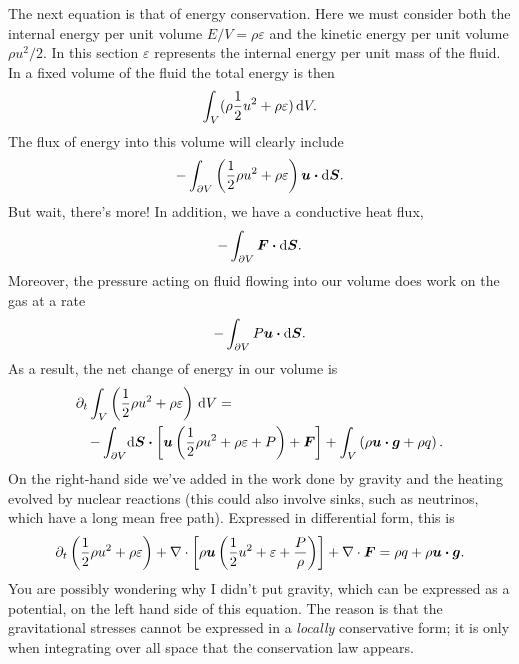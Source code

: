 The next equation is that of energy conservation. Here we must consider both the internal energy per unit volume $E/V = \rho \varepsilon$ and the kinetic energy per unit volume $\rho u^{2}/2$.  In this section $\varepsilon$ represents the internal energy per unit mass of the fluid. In a fixed volume of the fluid the total energy is then 
\[ \int_{V}(\rho \frac{1}{2}u^{2} + \rho \varepsilon)\,\mathrm{d} V. \]
The flux of energy into this volume will clearly include
\[ -\int_{\partial V}\left(\frac{1}{2}\rho u^{2} + \rho \varepsilon\right) \boldsymbol{u}\boldsymbol{\cdot}\mathrm{d}\boldsymbol{S}. \]
But wait, there's more!  In addition, we have a conductive heat flux, 
\[-\int_{\partial V}\boldsymbol{F}\boldsymbol{\cdot}\mathrm{d}\boldsymbol{S}.\] 
Moreover, the pressure acting on fluid flowing into our volume does work on the gas at a rate 
\[-\int_{\partial V}P\boldsymbol{u}\boldsymbol{\cdot}\mathrm{d}\boldsymbol{S}.\] 
As a result, the net change of energy in our volume is
\begin{eqnarray}
\lefteqn{\partial_{t}\int_{V}\left(\frac{1}{2}\rho u^{2} + \rho \varepsilon\right)\nsp\dif V = }\nonumber \\
 && -\int_{\partial V} \!\dif\bvec{S}\vdot\left[\vu\left(\frac{1}{2}\rho u^{2} + \rho \varepsilon + P\right) + \bvec{F}\right] + \int_{V} \left( \rho \vu\vdot\bvec{g} + \rho q\right).
\label{e.energy-1}
\end{eqnarray}
On the right-hand side we've added in the work done by gravity and the heating evolved by nuclear reactions (this could also involve sinks, such as neutrinos, which have a long mean free path).
Expressed in differential form, this is
\begin{equation}\label{e.energy-2}
 \partial_{t}\left(\frac{1}{2}\rho u^{2} + \rho \varepsilon\right) 
 	+ \nabla \cdot\left[\rho\boldsymbol{u}\left(\frac{1}{2} u^{2} + \varepsilon + \frac{P}{\rho}\right)\right]
	+ \nabla \cdot\boldsymbol{F} = \rho q + \rho \boldsymbol{u}\boldsymbol{\cdot}\boldsymbol{g}.
\end{equation}
You are possibly wondering why I didn't put gravity, which can be expressed as a potential, on the left hand side of this equation.  The reason is that the gravitational stresses cannot be expressed in a  \emph{locally} conservative form; it is only when integrating over all space that the conservation law appears.

